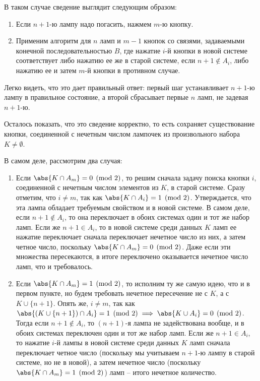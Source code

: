     В таком случае сведение выглядит следующим образом:

    \begin{enumerate}
        \item Если $n + 1$-ю лампу надо погасить, нажмем $m$-ю кнопку.

        \item Применим алгоритм для $n$ ламп и $m-1$ кнопок со связями, задаваемыми конечной последовательностью $B$, где нажатие $i$-й кнопки в новой системе соответствует либо нажатию ее же в старой системе, если $n + 1 \not\in A_i$, либо нажатию ее и затем $m$-й кнопки в противном случае.
    \end{enumerate}

    Легко видеть, что это дает правильный ответ: первый шаг устанавливает $n + 1$-ю лампу в правильное состояние, а второй сбрасывает первые $n$ ламп, не задевая $n + 1$-ю.

    Осталось показать, что это сведение корректно, то есть сохраняет существование кнопки, соединенной с нечетным числом лампочек из произвольного набора $K \ne \emptyset$.

    В самом деле, рассмотрим два случая:

    \begin{enumerate}
        \item Если $\abs{K \cap A_m} = 0 \pmod 2$, то решим сначала задачу поиска кнопки $i$, соединенной с нечетным числом элементов из $K$, в старой системе. Сразу отметим, что $i \ne m$, так как $\abs{K \cap A_i} = 1 \pmod 2$. Утверждается, что эта лампа обладает требуемым свойством и в новой системе. В самом деле, если $n + 1 \not\in A_i$, то она переключает в обоих системах один и тот же набор ламп. Если же $n + 1 \in A_i$, то в новой системе среди данных $K$ ламп ее нажатие переключает сначала переключает нечетное число из них, а затем четное число, поскольку $\abs{K \cap A_m} = 0 \pmod 2$. Даже если эти множества пересекаются, в итоге переключено оказывается нечетное число ламп, что и требовалось.

        \item Если $\abs{K \cap A_m} = 1 \pmod 2$, то исполним ту же самую идею, что и в первом пункте, но будем требовать нечетное пересечение не с $K$, а с $K \cup \{n + 1\}$. Опять же, $i \ne m$, так как $\abs{(K \cup \{n + 1\}) \cap A_i} = 1 \pmod 2 \implies \abs{K \cup A_i} = 0 \pmod 2$. Тогда если $n + 1 \not\in A_i$, то $(n + 1)$-я лампа не задействована вообще, и в обоих системах переключен один и тот же набор ламп. Если же $n + 1 \in A_i$, то нажатие $i$-й лампы в новой системе среди данных $K$ ламп сначала переключает четное число (поскольку мы учитываем $n + 1$-ю лампу в старой системе, но не в новой), а затем нечетное число (поскольку $\abs{K \cap A_m} = 1 \pmod 2$) ламп -- итого нечетное количество.
    \end{enumerate}

